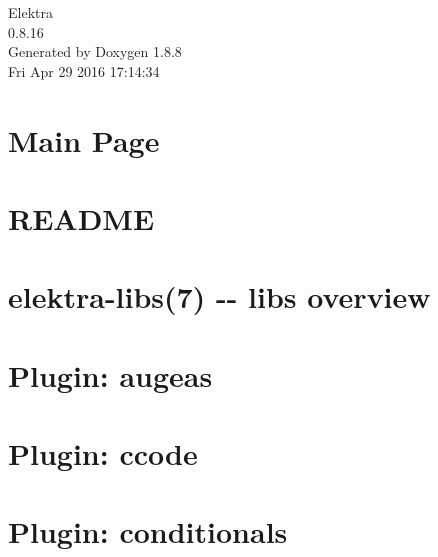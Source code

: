 \documentclass[twoside]{book}
\newcommand{\+}{\discretionary{\mbox{\scriptsize$\hookleftarrow$}}{}{}}
\newcommand{\clearemptydoublepage}{%
  \newpage{\pagestyle{empty}\cleardoublepage}%
}
\begin{document}
\hypersetup{pageanchor=false,
             bookmarks=true,
             bookmarksnumbered=true,
             pdfencoding=unicode
            }
\begin{titlepage}
\vspace*{7cm}
\begin{center}%
{\Large Elektra \\[1ex]\large 0.\+8.\+16 }\\
\vspace*{1cm}
{\large Generated by Doxygen 1.8.8}\\
\vspace*{0.5cm}
{\small Fri Apr 29 2016 17:14:34}\\
\end{center}
\end{titlepage}
\clearemptydoublepage
\tableofcontents
\clearemptydoublepage
{}
\hypersetup{pageanchor=true}

\chapter{Main Page}
\label{index}\hypertarget{index}{}
\chapter{R\+E\+A\+D\+M\+E}
\label{md_src_libs_getenv_README}
\hypertarget{md_src_libs_getenv_README}{}

\chapter{elektra-\/libs(7) -\/-\/ libs overview}
\label{md_src_libs_README}
\hypertarget{md_src_libs_README}{}

\chapter{Plugin\+: augeas}
\label{md_src_plugins_augeas_README}
\hypertarget{md_src_plugins_augeas_README}{}

\chapter{Plugin\+: ccode}
\label{md_src_plugins_ccode_README}
\hypertarget{md_src_plugins_ccode_README}{}

\chapter{Plugin\+: conditionals}
\label{md_src_plugins_conditionals_README}
\hypertarget{md_src_plugins_conditionals_README}{}

\end{document}
